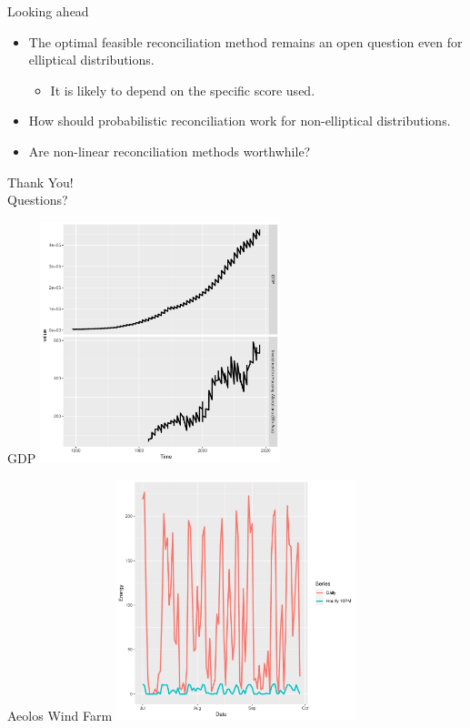 \documentclass{beamer}
\begin{document}
   \begin{frame}{Looking ahead}\label{simdisc}
     \begin{itemize}
     	\item The optimal feasible reconciliation method remains an open question even for elliptical distributions.
     	\pause
     	\begin{itemize}
     		\item It is likely to depend on the specific score used.
     	\end{itemize}
        \pause
        \item How should probabilistic reconciliation work for non-elliptical distributions.
        \pause
        \item Are non-linear reconciliation methods worthwhile?
     \end{itemize}	
   \end{frame}
  \begin{frame}
    \Huge{Thank You!}\\
  \pause\Huge{Questions?}
  \end{frame}
  \begin{frame}{GDP}\label{GDP}
  \includegraphics[height=7cm]{Figs/GDP}
  \hyperlink{afterdat}{\beamerbutton{}}
\end{frame}
  \begin{frame}{Aeolos Wind Farm}\label{aelos}
  \centering
  \includegraphics[height=7cm]{Figs/Aeolos_Unscaled}
  \end{frame}
\end{document}
